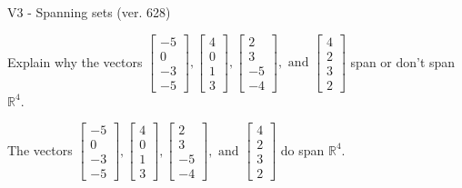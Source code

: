 \begin{exercise}
  \begin{exerciseTitle}V3 - Spanning sets (ver. 628)\end{exerciseTitle}
  \begin{exerciseStatement}
    Explain why the vectors \(\left[\begin{array}{r}
-5 \\
0 \\
-3 \\
-5
\end{array}\right] , \left[\begin{array}{r}
4 \\
0 \\
1 \\
3
\end{array}\right] , \left[\begin{array}{r}
2 \\
3 \\
-5 \\
-4
\end{array}\right] , \text{ and } \left[\begin{array}{r}
4 \\
2 \\
3 \\
2
\end{array}\right]\) span or don't span \(\mathbb{R}^4\). 
	


  \end{exerciseStatement}
  \begin{exerciseAnswer}
   The vectors \(\left[\begin{array}{r}
-5 \\
0 \\
-3 \\
-5
\end{array}\right] , \left[\begin{array}{r}
4 \\
0 \\
1 \\
3
\end{array}\right] , \left[\begin{array}{r}
2 \\
3 \\
-5 \\
-4
\end{array}\right] , \text{ and } \left[\begin{array}{r}
4 \\
2 \\
3 \\
2
\end{array}\right]\) 
  	 do  
	span \(\mathbb{R}^4\).
  


  \end{exerciseAnswer}
\end{exercise}